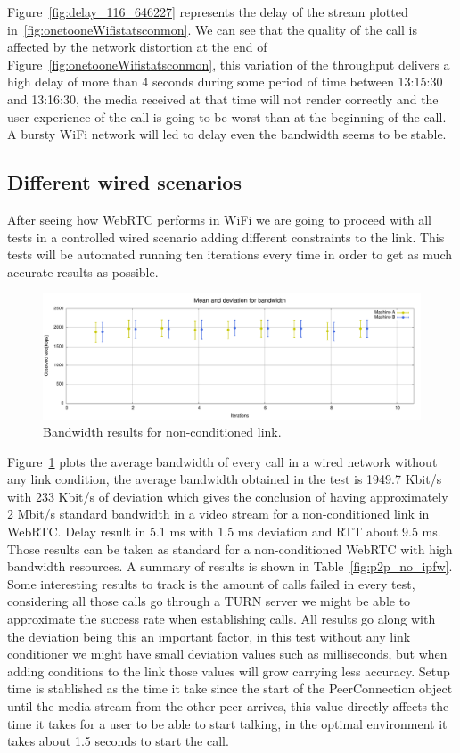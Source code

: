 Figure~\ref{fig:delay_116_646227} represents the delay of the stream plotted in~\ref{fig:onetooneWifistatsconmon}. We can see that the quality of the call is affected by the network distortion at the end of Figure~\ref{fig:onetooneWifistatsconmon}, this variation of the throughput delivers a high delay of more than 4 seconds during some period of time between 13:15:30 and 13:16:30, the media received at that time will not render correctly and the user experience of the call is going to be worst than at the beginning of the call. A bursty WiFi network will led to delay even the bandwidth seems to be stable.

\subsection{Different wired scenarios}

After seeing how WebRTC performs in WiFi  we are going to proceed with all tests in a controlled wired scenario adding different constraints to the link. This tests will be automated running ten iterations every time in order to get as much accurate results as possible.
 
 \begin{figure}[h]
  \centering
    \includegraphics[width=1\textwidth]{./figures/no_ipfw.pdf}
      \caption[Bandwidth results for non-conditioned link]{Bandwidth results for non-conditioned link.}
	\label{fig:no_ipfw}
\end{figure}

Figure~\ref{fig:no_ipfw} plots the average bandwidth of every call in a wired network without any link condition, the average bandwidth obtained in the test is 1949.7 Kbit/s with 233 Kbit/s of deviation which gives the conclusion of having approximately 2 Mbit/s standard bandwidth in a video stream for a non-conditioned link in WebRTC. Delay result in 5.1 ms with 1.5 ms deviation and RTT about 9.5 ms. Those results can be taken as standard for a non-conditioned WebRTC with high bandwidth resources. A summary of results is shown in Table~\ref{fig:p2p_no_ipfw}. Some interesting results to track is the amount of calls failed in every test, considering all those calls go through a TURN server we might be able to approximate the success rate when establishing calls. All results go along with the deviation being this an important factor, in this test without any link conditioner we might have small deviation values such as milliseconds, but when adding conditions to the link those values will grow carrying less accuracy.
Setup time is stablished as the time it take since the start of the PeerConnection object until the media stream from the other peer arrives, this value directly affects the time it takes for a user to be able to start talking, in the optimal environment it takes about 1.5 seconds to start the call.

